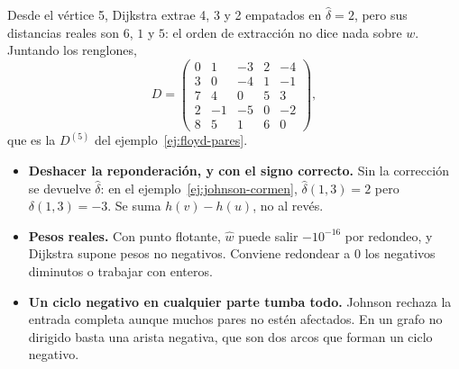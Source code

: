 \documentclass[11pt,letterpaper]{article}
\begin{document}
\begin{ejemplo}
\begin{center}
  \hspace{1cm}
  \end{center}
  Desde el vértice 5, Dijkstra extrae 4, 3 y 2 empatados en
  $\hat{\delta} = 2$, pero sus distancias reales son $6$, $1$ y $5$: el
  orden de extracción no dice nada sobre $w$. Juntando los renglones,
  \[
    D = \begin{pmatrix}
      0 & 1 & -3 & 2 & -4 \\
      3 & 0 & -4 & 1 & -1 \\
      7 & 4 & 0 & 5 & 3 \\
      2 & -1 & -5 & 0 & -2 \\
      8 & 5 & 1 & 6 & 0
    \end{pmatrix} ,
  \]
  que es la $D^{(5)}$ del ejemplo~\ref{ej:floyd-pares}.
\end{ejemplo}

\begin{ojo}[breakable]
  \begin{itemize}[itemsep=0.2em, leftmargin=1.2em]
    \item \textbf{Deshacer la reponderación, y con el signo correcto.}
          Sin la corrección se devuelve $\hat{\delta}$: en el
          ejemplo~\ref{ej:johnson-cormen},
          $\hat{\delta}(1, 3) = 2$ pero $\delta(1, 3) = -3$. Se suma
          $h(v) - h(u)$, no al revés.
    \item \textbf{Pesos reales.} Con punto flotante, $\hat{w}$ puede
          salir $-10^{-16}$ por redondeo, y Dijkstra supone pesos no
          negativos. Conviene redondear a $0$ los negativos diminutos
          o trabajar con enteros.
    \item \textbf{Un ciclo negativo en cualquier parte tumba todo.}
          Johnson rechaza la entrada completa aunque muchos pares no
          estén afectados. En un grafo no dirigido basta una arista
          negativa, que son dos arcos que forman un ciclo negativo.
  \end{itemize}
\end{ojo}
\end{document}
